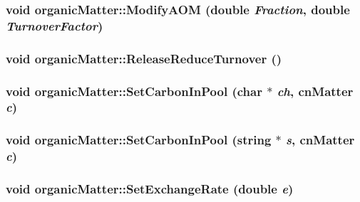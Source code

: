 \label{classorganic_matter_ae6148352b9c917d7c35e7452d4d62449}
\hypertarget{classorganic_matter_a97b9ea17f175972db509425152e7f69a}{
\subsubsection[{ModifyAOM}]{\setlength{\rightskip}{0pt plus 5cm}void organicMatter::ModifyAOM (double {\em Fraction}, \/  double {\em TurnoverFactor})}}
\label{classorganic_matter_a97b9ea17f175972db509425152e7f69a}
\hypertarget{classorganic_matter_acbad19492414d3cf2ce1553d87569415}{
\subsubsection[{ReleaseReduceTurnover}]{\setlength{\rightskip}{0pt plus 5cm}void organicMatter::ReleaseReduceTurnover ()}}
\label{classorganic_matter_acbad19492414d3cf2ce1553d87569415}
\hypertarget{classorganic_matter_ad28011da0fd7454eaa1f9aed545bfdc6}{
\subsubsection[{SetCarbonInPool}]{\setlength{\rightskip}{0pt plus 5cm}void organicMatter::SetCarbonInPool (char $\ast$ {\em ch}, \/  {\bf cnMatter} {\em c})}}
\label{classorganic_matter_ad28011da0fd7454eaa1f9aed545bfdc6}
\hypertarget{classorganic_matter_a78a87a55fb5d119b774c4f93d7994493}{
\subsubsection[{SetCarbonInPool}]{\setlength{\rightskip}{0pt plus 5cm}void organicMatter::SetCarbonInPool (string $\ast$ {\em s}, \/  {\bf cnMatter} {\em c})}}
\label{classorganic_matter_a78a87a55fb5d119b774c4f93d7994493}
\hypertarget{classorganic_matter_a3dd11964f9c983b37c88328c80a978c1}{
\subsubsection[{SetExchangeRate}]{\setlength{\rightskip}{0pt plus 5cm}void organicMatter::SetExchangeRate (double {\em e})}}
